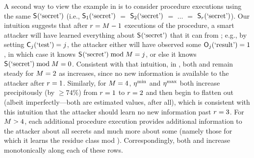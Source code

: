 A second way to view the example in  is to
consider \roundNmbr procedure executions using the same
$\mathsf{S}_{}(\textrm{`secret'})$ (i.e., $\mathsf{S}_{1}(\textrm{`secret'})$ $=$
$\mathsf{S}_{2}(\textrm{`secret'})$ $=$ $\ldots$ $=$
$\mathsf{S}_{r}(\textrm{`secret'})$).  Our intuition suggests that after
$r = M-1$ executions of the procedure, a smart
attacker will have learned everything about $\mathsf{S}_{}(\textrm{`secret'})$
that it can from \proc; e.g., by setting
$\mathsf{C}_{j}(\textrm{`test'}) = j$, the attacker either
will have observed some $\mathsf{O}_{j}(\textrm{`result'}) = 1$, in
which case it knows $\mathsf{S}_{}(\textrm{`secret'}) \bmod M = j$,
or else it knows $\mathsf{S}_{}(\textrm{`secret'}) \bmod M = 0$.
Consistent with that intuition, in , both
\secretsSetSizeMin{} and \secretsSetSizeMax{} remain steady for
$M = 2$ as \roundNmbr increases, since no new information is
available to the attacker after $r=1$. Similarly, for
$M = 4$, $\eta^{\textrm{min}}_{}$ and $\eta^{\textrm{max}}_{}$ both
increase precipitously (by $\ge 74\%$) from $r=1$ to
$r=2$ and then begin to flatten out (albeit
imperfectly---both are estimated values, after all), which is
consistent with this intuition that the attacker should learn no new
information past $r = 3$.  For $M > 4$, each
additional procedure execution provides additional information to the
attacker about all secrets and much more about some (namely those for
which it learns the residue class mod \modulus).  Correspondingly,
both \secretsSetSizeMin{} and \secretsSetSizeMax{} increase
monotonically along each of these rows.

